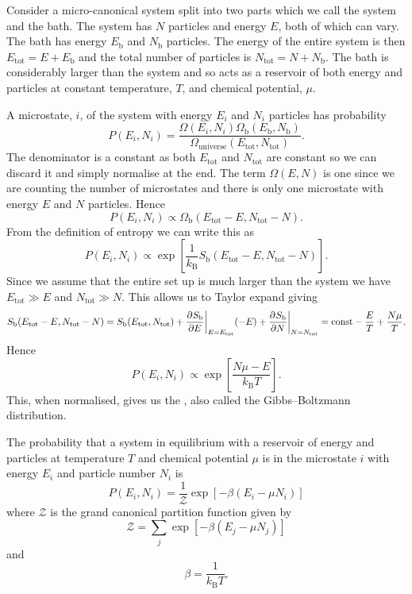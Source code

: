 \documentclass[a4paper]{article}
\newcommand{\boltzmann}{k_\mathrm{B}}
\newcommand{\tot}{{\mathrm{tot}}}
\newcommand{\partition}{\mathcal{Z}}
\newcounter{keypointcounter}
\newenvironment{keypoint}{%
    \stepcounter{keypointcounter}
    \begin{tcolorbox}[breakable, title=Key Point \thekeypointcounter]
}{%
    \end{tcolorbox}
}
\begin{document}
    Consider a micro-canonical system split into two parts which we call the system and the bath.
    The system has \(N\) particles and energy \(E\), both of which can vary.
    The bath has energy \(E_{\mathrm{b}}\) and \(N_{\mathrm{b}}\) particles.
    The energy of the entire system is then \(E_\tot = E + E_{\mathrm{b}}\) and the total number of particles is \(N_\tot = N + N_{\mathrm{b}}\).
    The bath is considerably larger than the system and so acts as a reservoir of both energy and particles at constant temperature, \(T\), and chemical potential, \(\mu\).
    
    A microstate, \(i\), of the system with energy \(E_i\) and \(N_i\) particles has probability
    \[P(E_i, N_i) = \frac{\Omega(E_i, N_i) \Omega_{\mathrm{b}}(E_{\mathrm{b}}, N_{\mathrm{b}})}{\Omega_{\mathrm{universe}}(E_\tot, N_\tot)}.\]
    The denominator is a constant as both \(E_\tot\) and \(N_\tot\) are constant so we can discard it and simply normalise at the end.
    The term \(\Omega(E, N)\) is one since we are counting the number of microstates and there is only one microstate with energy \(E\) and \(N\) particles.
    Hence
    \[P(E_i, N_i) \propto \Omega_{\mathrm{b}}(E_\tot - E, N_\tot - N).\]
    From the definition of entropy we can write this as
    \[P(E_i, N_i) \propto \exp\left[ \frac{1}{\boltzmann} S_{\mathrm{b}}(E_\tot - E, N_\tot - N) \right].\]
    Since we assume that the entire set up is much larger than the system we have \(E_\tot \gg E\) and \(N_\tot \gg N\).
    This allows us to Taylor expand giving
    \[S_{\mathrm{b}}(E_\tot - E, N_\tot - N) = S_{\mathrm{b}}(E_\tot, N_\tot) + \pdvat{S_{\mathrm{b}}}{E}{E=E_\tot}(-E) + \pdvat{S_{\mathrm{b}}}{N}{N=N_\tot} = \text{const} - \frac{E}{T} + \frac{N\mu}{T}.\]
    Hence
    \[P(E_i, N_i) \propto \exp\left[ \frac{N\mu - E}{\boltzmann T} \right].\]
    This, when normalised, gives us the , also called the Gibbs--Boltzmann distribution.
    \begin{keypoint}
        The probability that a system in equilibrium with a reservoir of energy and particles at temperature \(T\) and chemical potential \(\mu\) is in the microstate \(i\) with energy \(E_i\) and particle number \(N_i\) is
        \[P(E_i, N_i) = \frac{1}{\partition}\exp\left[ -\beta(E_i - \mu N_i) \right]\]
        where \(\partition\) is the grand canonical partition function given by
        \[\partition = \sum_j\exp\left[ -\beta(E_j - \mu N_j) \right]\]
        and
        \[\beta = \frac{1}{\boltzmann T}.\]
    \end{keypoint}
\end{document}
